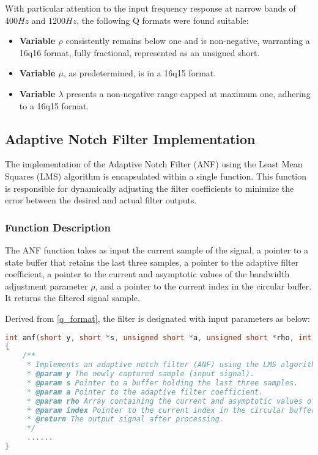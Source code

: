 With particular attention to the input frequency response at narrow bands of $400Hz$ and $1200Hz$, the following Q formats were found suitable:

\begin{itemize}
    \item \textbf{Variable $\rho$} consistently remains below one and is non-negative, warranting a 16q16 format, fully fractional, represented as an unsigned short.
    \item \textbf{Variable $\mu$}, as predetermined, is in a 16q15 format.
    \item \textbf{Variable $\lambda$} presents a non-negative range capped at maximum one, adhering to a 16q15 format.
\end{itemize}

\subsection{Adaptive Notch Filter Implementation}
The implementation of the Adaptive Notch Filter (ANF) using the Least Mean Squares (LMS) algorithm is encapsulated within a single function. This function is responsible for dynamically adjusting the filter coefficients to minimize the error between the desired and actual filter outputs.

\subsubsection{Function Description}
The ANF function takes as input the current sample of the signal, a pointer to a state buffer that retains the last three samples, a pointer to the adaptive filter coefficient, a pointer to the current and asymptotic values of the bandwidth adjustment parameter $\rho$, and a pointer to the current index in the circular buffer. It returns the filtered signal sample.



Derived from \autoref{q_format}, the filter is designated with input parameters as below:
\begin{lstlisting}[language=C, basicstyle=\small]
int anf(short y, short *s, unsigned short *a, unsigned short *rho, int *index)
{
    /**
     * Implements an adaptive notch filter (ANF) using the LMS algorithm.
     * @param y The newly captured sample (input signal).
     * @param s Pointer to a buffer holding the last three samples.
     * @param a Pointer to the adaptive filter coefficient.
     * @param rho Array containing the current and asymptotic values of rho.
     * @param index Pointer to the current index in the circular buffer s.
     * @return The output signal after processing.
     */
     ......
}
\end{lstlisting}

